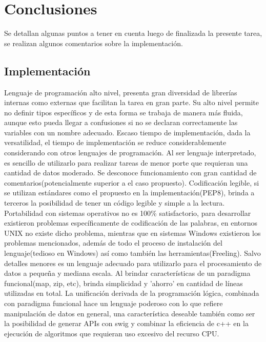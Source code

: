 \documentclass[12pt]{article}
\begin{document}
\section{Conclusiones}\label{conclusions}
Se detallan algunas puntos a tener en cuenta luego de finalizada la presente tarea, se realizan algunos comentarios sobre la implementación.

\subsection{Implementación}
Lenguaje de programación alto nivel, presenta gran diversidad de librerías internas como externas que facilitan la tarea en gran parte. Su alto nivel permite no definir tipos específicos y de esta forma se trabaja de manera más fluida, aunque esto pueda llegar a confusiones si no se declaran correctamente las variables con un nombre adecuado.
Escaso tiempo de implementación, dada la versatilidad, el tiempo de implementación se reduce considerablemente considerando con otros lenguajes de programación.
Al ser lenguaje interpretado, es sencillo de utilizarlo para realizar tareas de menor porte que requieran una cantidad de datos moderado. Se desconoce funcionamiento con gran cantidad de comentarios(potencialmente superior a el caso propuesto).
Codificación legible, si se utilizan estándares como el propuesto en la implementación(PEP8), brinda a terceros la posibilidad de tener un código legible y simple a la lectura.
Portabilidad con sistemas operativos no es 100\% satisfactorio, para desarrollar existieron problemas específicamente de codificación de las palabras, en entornos UNIX no existe dicho problema, mientras que en sistemas Windows existieron los problemas mencionados, además de todo el proceso de instalación del lenguaje(tedioso en Windows) así como también las herramientas(Freeling).
Salvo detalles menores es un lenguaje adecuado para utilizarlo para el procesamiento de datos a pequeña y mediana escala.
Al brindar características de un paradigma funcional(map, zip, etc), brinda simplicidad y 'ahorro' en cantidad de líneas utilizadas en total.
La unificación derivada de la programación lógica, combinada con paradigma funcional hace un lenguaje poderoso con lo que refiere manipulación de datos en general, una característica deseable también como  ser la posibilidad de generar APIs con swig y combinar la eficiencia de c++ en la ejecución de algoritmos que requieran uso excesivo del recurso CPU. 





%
%
\end{document}
